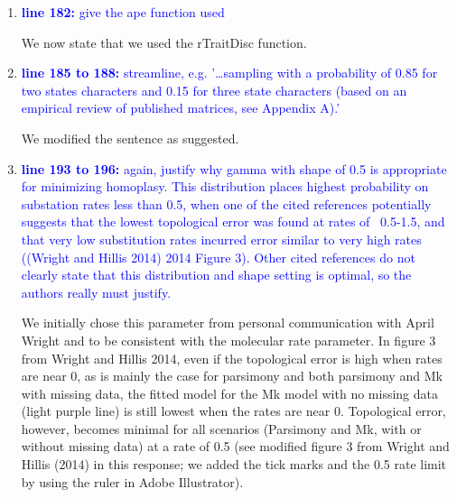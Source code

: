 \documentclass[12pt,letterpaper]{article}
\begin{document}
\begin{enumerate}
\item{\textcolor{blue}{\textbf{line 182:} give the ape function used}}

We now state that we used the rTraitDisc function.

\item{\textcolor{blue}{\textbf{line 185 to 188:} streamline, e.g. '…sampling with a probability of 0.85 for two states characters and 0.15 for three state characters (based on an empirical review of published matrices, see Appendix A).'}}

We modified the sentence as suggested.

\item{\textcolor{blue}{\textbf{line 193 to 196:} again, justify why gamma with shape of 0.5 is appropriate for minimizing homoplasy. This distribution places highest probability on substation rates less than 0.5, when one of the cited references potentially suggests that the lowest topological error was found at rates of ~0.5-1.5, and that very low substitution rates incurred error similar to very high rates ((Wright and Hillis 2014) 2014 Figure 3). Other cited references do not clearly state that this distribution and shape setting is optimal, so the authors really must justify. }}

We initially chose this parameter from personal communication with April Wright and to be consistent with the molecular rate parameter.
In figure 3 from Wright and Hillis 2014, even if the topological error is high when rates are near 0, as is mainly the case for parsimony and both parsimony and Mk with missing data, the fitted model for the Mk model with no missing data (light purple line) is still lowest when the rates are near 0.
Topological error, however, becomes minimal for all scenarios (Parsimony and Mk, with or without missing data) at a rate of 0.5 (see modified figure 3 from Wright and Hillis (2014) in this response; we added the tick marks and the 0.5 rate limit by using the ruler in Adobe Illustrator).


\end{enumerate}
\end{document}
